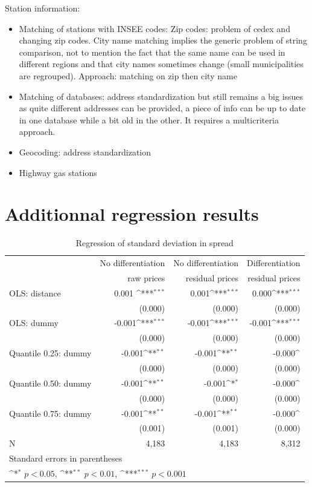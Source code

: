 \documentclass[11pt]{article}
\begin{document}
Station information:
\begin{itemize}
\item Matching of stations with INSEE codes: Zip codes: problem of cedex and changing zip codes. City name matching implies the generic problem of string comparison, not to mention the fact that the same name can be used in different regions and that city names sometimes change (small municipalities are regrouped). Approach: matching on zip then city name
\item Matching of databases: address standardization but still remains a big issues as quite different addresses can be provided, a piece of info can be up to date in one database while a bit old in the other. It requires a multicriteria approach.
\item Geocoding: address standardization
\item Highway gas stations
\end{itemize}

\section{Additionnal regression results}

\begin{table}[htbp]\centering
\def\sym#1{\ifmmode^{#1}\else\(^{#1}\)\fi}
\caption{Regression of standard deviation in spread}
\begin{tabular}{lrrr}
\hline
\hline
{} & No differentiation & No differentiation & Differentiation \\
{} & raw prices & residual prices & residual prices \\
\hline
OLS: distance &  0.001 \sym{***}&      0.001\sym{***}&       0.000\sym{***}\\
{} &     (0.000)         &     (0.000)         &     (0.000)   \\
OLS: dummy &  -0.001\sym{***}&      -0.001\sym{***}&     -0.001\sym{***}\\
{} &    (0.000)     &     (0.000)         &     (0.000) \\
Quantile 0.25: dummy     &       -0.001\sym{**}&       -0.001\sym{**}&       -0.000\sym{}\\
{} &     (0.000)       &     (0.000)         &     (0.000)  \\
Quantile 0.50: dummy     &       -0.001\sym{**}&      -0.001\sym{*}&       -0.000\sym{}\\
{} &  (0.000)         &     (0.000)         &     (0.000)    \\
Quantile 0.75: dummy     &       -0.001\sym{**}&     -0.001\sym{**}&       -0.000\sym{}\\
{} &     (0.001)         &     (0.001)         &     (0.000)   \\
\hline
N      &     4,183         &     4,183      &     8,312    \\
\hline\hline
\multicolumn{4}{l}{\footnotesize Standard errors in parentheses}\\
\multicolumn{4}{l}{\footnotesize \sym{*} \(p<0.05\), \sym{**} \(p<0.01\), \sym{***} \(p<0.001\)}\\
\end{tabular}
\end{table}
\end{document}

